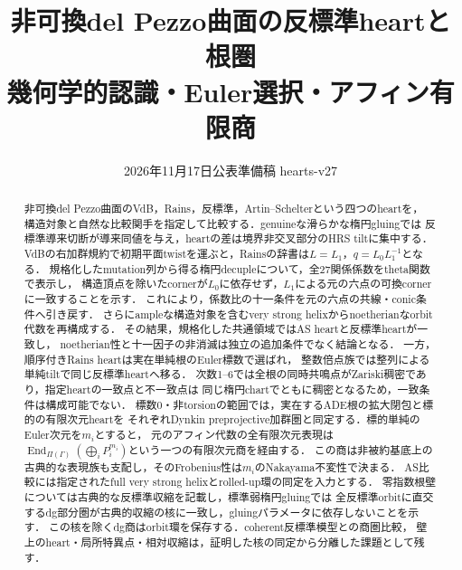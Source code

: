 \documentclass[11pt,a4paper]{ltjsarticle}
\title{非可換del Pezzo曲面の反標準heartと根圏\\
\large 幾何学的認識・Euler選択・アフィン有限商}
\author{}
\date{2026年11月17日\qquad 公表準備稿 hearts-v27}
\theoremstyle{definition}
\DeclareMathOperator{\End}{End}\DeclareMathOperator{\RHom}{RHom}
\begin{document}
\maketitle
\begin{abstract}
非可換del Pezzo曲面のVdB，Rains，反標準，Artin--Schelterという四つのheartを，
構造対象と自然な比較関手を指定して比較する．genuineな滑らかな楕円gluingでは
反標準導来切断が導来同値を与え，heartの差は境界非交叉部分のHRS tiltに集中する．
VdBの右加群規約で初期平面twistを運ぶと，Rainsの辞書は$L=L_1$，$q=L_0L_1^{-1}$となる．
規格化したmutation列から得る楕円decupleについて，全27関係係数をtheta関数で表示し，
構造頂点を除いたcornerが$L_0$に依存せず，$L_1$による元の六点の可換cornerに一致することを示す．
これにより，係数比の十一条件を元の六点の共線・conic条件へ引き戻す．
さらにampleな構造対象を含むvery strong helixからnoetherianなorbit代数を再構成する．
その結果，規格化した共通領域ではAS heartと反標準heartが一致し，
noetherian性と十一因子の非消滅は独立の追加条件でなく結論となる．
一方，順序付きRains heartは実在単純根のEuler標数で選ばれ，
整数倍点族では整列による単純tiltで同じ反標準heartへ移る．
次数1--6では全根の同時共鳴点がZariski稠密であり，指定heartの一致点と不一致点は
同じ楕円chartでともに稠密となるため，一致条件は構成可能でない．
標数0・非torsionの範囲では，実在するADE根の拡大閉包と標的の有限次元heartを
それぞれDynkin preprojective加群圏と同定する．標的単純のEuler次元を$m_i$とすると，
元のアフィン代数の全有限次元表現は
$\End_{\Pi(\Gamma)}(\bigoplus_iP_i^{m_i})$という一つの有限次元商を経由する．
この商は非被約基底上の古典的な表現族も支配し，そのFrobenius性は$m_i$のNakayama不変性で決まる．
AS比較には指定されたfull very strong helixとrolled-up環の同定を入力とする．
零指数根壁については古典的な反標準収縮を記載し，標準弱楕円gluingでは
全反標準orbitに直交するdg部分圏が古典的収縮の核に一致し，gluingパラメータに依存しないことを示す．
この核を除くdg商はorbit環を保存する．coherent反標準模型との商圏比較，
壁上のheart・局所特異点・相対収縮は，証明した核の同定から分離した課題として残す．
\end{abstract}
\tableofcontents











\end{document}
